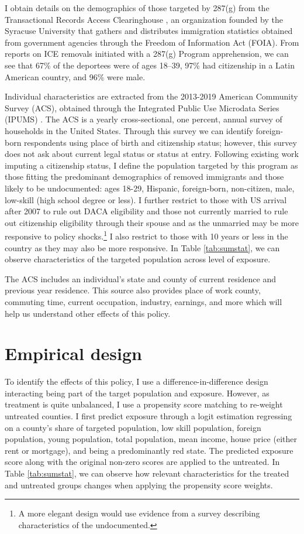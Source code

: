 \documentclass{article}
\begin{document}
I obtain details on the demographics of those targeted by 287(g) from the Transactional Records Access Clearinghouse \citep{trac24}, an organization founded by the Syracuse University that gathers and distributes immigration statistics obtained from government agencies through the Freedom of Information Act (FOIA). From reports on ICE removals initiated with a 287(g) Program apprehension, we can see that 67\% of the deportees were of ages 18--39, 97\% had citizenship in a Latin American country, and 96\% were male. 

Individual characteristics are extracted from the 2013-2019 American Community Survey (ACS), obtained through the Integrated Public Use Microdata Series (IPUMS) \citep{data:acs}. The ACS is a yearly cross-sectional, one percent, annual survey of households in the United States. Through this survey we can identify foreign-born respondents using place of birth and citizenship status; however, this survey does not ask about current legal status or status at entry. Following existing work imputing a citizenship status, I define the population targeted by this program as those fitting the predominant demographics of removed immigrants and those likely to be undocumented: ages 18-29, Hispanic, foreign-born, non-citizen, male, low-skill (high school degree or less). I further restrict to those with US arrival after 2007 to rule out DACA eligibility and those not currently married to rule out citizenship eligibility through their spouse and as the unmarried may be more responsive to policy shocks.\footnote{A more elegant design would use evidence from a survey describing characteristics of the undocumented.} I also restrict to those with 10 years or less in the country as they may also be more responsive. In Table \ref{tab:sumstat}, we can observe characteristics of the targeted population across level of exposure.

The ACS includes an individual's state and county of current residence and previous year residence. This source also provides  place of work county, commuting time, current occupation, industry, earnings, and more which will help us understand other effects of this policy.


\section{Empirical design}
To identify the effects of this policy, I use a difference-in-difference design interacting being part of the target population and exposure. However, as treatment is quite unbalanced, I use a propensity score matching to re-weight untreated counties. I first predict exposure through a logit estimation regressing on a county's share of targeted population, low skill population, foreign population, young population, total population, mean income, house price (either rent or mortgage), and being a predominantly red state. The predicted exposure score along with the original non-zero scores are applied to the untreated. In Table \ref{tab:sumstat}, we can observe how relevant characteristics for the treated and untreated groups changes when applying the propensity score weights.
\end{document}
